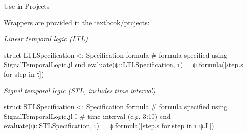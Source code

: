 \begin{frame}[fragile,t]{Use in Projects}

Wrappers are provided in the textbook/projects:

\pause
\phantom{}

\textit{Linear temporal logic (LTL)}
\begin{footnotesize}
\begin{algorithmblock}
\begin{juliaverbatim}
struct LTLSpecification <: Specification
	formula # formula specified using SignalTemporalLogic.jl
end
evaluate(ψ::LTLSpecification, τ) = ψ.formula([step.s for step in τ])
\end{juliaverbatim}
\end{algorithmblock}
\end{footnotesize}

\pause
\phantom{}

\textit{Signal temporal logic (STL, includes time interval)}
\begin{footnotesize}
\begin{algorithmblock}
\begin{juliaverbatim}
struct STLSpecification <: Specification
    formula # formula specified using SignalTemporalLogic.jl
    I       # time interval (e.g. 3:10)
end
evaluate(ψ::STLSpecification, τ) = ψ.formula([step.s for step in τ[ψ.I]])
\end{juliaverbatim}
\end{algorithmblock}
\end{footnotesize}

\end{frame}